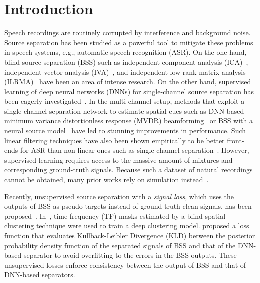 \documentclass[a4paper]{article}
\begin{document}
\section{Introduction}
Speech recordings are routinely corrupted by interference and background noise. 
Source separation has been studied as a powerful tool to mitigate these problems in speech systems, e.g., automatic speech recognition (ASR).
On the one hand, blind source separation (BSS) such as independent component analysis (ICA)~\cite{ica}, independent vector analysis (IVA)~\cite{iva_kim,iva_hiroe}, and independent low-rank matrix analysis (ILRMA)~\cite{ilrma} have been an area of intense research.
On the other hand, supervised learning of deep neural networks (DNNs) for single-channel source separation has been eagerly investigated~\cite{pit,dc,tasnet}.
In the multi-channel setup, methods that exploit a single-channel separation network to estimate spatial cues such as DNN-based minimum variance distortionless response (MVDR) beamforming~\cite{mvdr_heymann,mvdr_ochiai,cisdr} or BSS with a neural source model~\cite{duong_dnn,idlma, auxiva-iss-dnn} have led to stunning improvements in performance.
Such linear filtering techniques have also been shown empirically to be better front-ends for ASR than non-linear ones such as single-channel separation~\cite{haeb2020far}.
However, supervised learning requires access to the massive amount of mixtures and corresponding ground-truth signals.
Because such a dataset of natural recordings cannot be obtained, many prior works rely on simulation instead~\cite{pra,haeb2020far}.

Recently, unsupervised source separation with a \textit{signal loss}, which uses the outputs of BSS as pseudo-targets instead of ground-truth clean signals, has been proposed~\cite{Drude-unsup, Togami-unsup-kld}.
In~\cite{Drude-unsup}, time-frequency (TF) masks estimated by a blind spatial clustering technique were used to train a deep clustering model.
\cite{Togami-unsup-kld} proposed a loss function that evaluates Kullback-Leibler Divergence (KLD) between the posterior probability density function of the separated signals of BSS and that of the DNN-based separator to avoid overfitting to the errors in the BSS outputs.
These unsupervised losses enforce consistency between the output of BSS and that of DNN-based separators.
\end{document}
